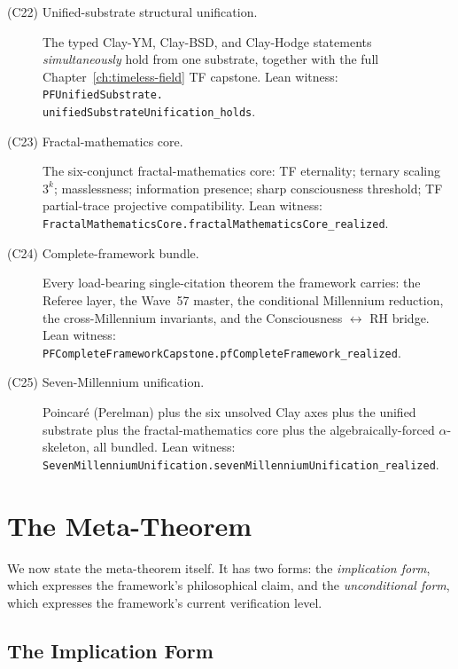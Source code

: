 \begin{description}
\item[\textnormal{(C22) Unified-substrate structural unification.}]
The typed Clay-YM, Clay-BSD, and Clay-Hodge statements
\emph{simultaneously} hold from one substrate, together with
the full Chapter~\ref{ch:timeless-field} TF capstone.
Lean witness:
\texttt{PFUnifiedSubstrate.\\unifiedSubstrateUnification\_holds}.

\item[\textnormal{(C23) Fractal-mathematics core.}]
The six-conjunct fractal-mathematics core: TF eternality;
ternary scaling $3^k$; masslessness; information presence;
sharp consciousness threshold; TF partial-trace projective
compatibility. Lean witness:
\texttt{Fractal\allowbreak{}Mathematics\allowbreak{}Core.fractal\allowbreak{}Mathematics\allowbreak{}Core\_\allowbreak{}realized}.

\item[\textnormal{(C24) Complete-framework bundle.}]
Every load-bearing single-citation theorem the framework
carries: the Referee layer, the Wave~57 master, the
conditional Millennium reduction, the cross-Millennium
invariants, and the Consciousness $\leftrightarrow$ RH
bridge. Lean witness:
\texttt{PFComplete\allowbreak{}Framework\allowbreak{}Capstone.pf\allowbreak{}Complete\allowbreak{}Framework\_\allowbreak{}realized}.

\item[\textnormal{(C25) Seven-Millennium unification.}]
Poincar\'e (Perelman) plus the six unsolved Clay axes plus
the unified substrate plus the fractal-mathematics core plus
the algebraically-forced $\alpha$-skeleton, all bundled.
Lean witness:
\texttt{Seven\allowbreak{}Millennium\allowbreak{}Unification.seven\allowbreak{}Millennium\allowbreak{}Unification\_\allowbreak{}realized}.
\end{description}

\section{The Meta-Theorem}
\label{sec:substrate-meta-theorem}

We now state the meta-theorem itself. It has two forms: the
\emph{implication form}, which expresses the framework's
philosophical claim, and the \emph{unconditional form}, which
expresses the framework's current verification level.

\subsection{The Implication Form}
\label{subsec:substrate-meta-theorem-implication}

